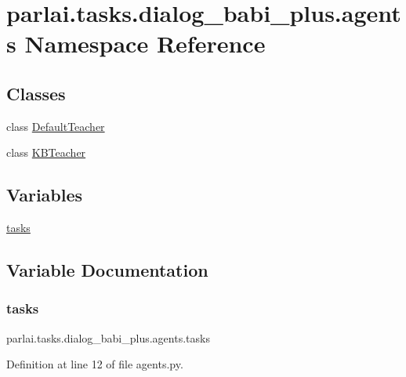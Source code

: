\hypertarget{namespaceparlai_1_1tasks_1_1dialog__babi__plus_1_1agents}{}\section{parlai.\+tasks.\+dialog\+\_\+babi\+\_\+plus.\+agents Namespace Reference}
\label{namespaceparlai_1_1tasks_1_1dialog__babi__plus_1_1agents}
\subsection*{Classes}
\begin{DoxyCompactItemize}
\item 
class \hyperlink{classparlai_1_1tasks_1_1dialog__babi__plus_1_1agents_1_1DefaultTeacher}{Default\+Teacher}
\item 
class \hyperlink{classparlai_1_1tasks_1_1dialog__babi__plus_1_1agents_1_1KBTeacher}{K\+B\+Teacher}
\end{DoxyCompactItemize}
\subsection*{Variables}
\begin{DoxyCompactItemize}
\item 
\hyperlink{namespaceparlai_1_1tasks_1_1dialog__babi__plus_1_1agents_afa6b2daed49397ccd70b3be5414eaea5}{tasks}
\end{DoxyCompactItemize}


\subsection{Variable Documentation}
\mbox{\label{namespaceparlai_1_1tasks_1_1dialog__babi__plus_1_1agents_afa6b2daed49397ccd70b3be5414eaea5}} 
\subsubsection{\texorpdfstring{tasks}{tasks}}
{\footnotesize\ttfamily parlai.\+tasks.\+dialog\+\_\+babi\+\_\+plus.\+agents.\+tasks}



Definition at line 12 of file agents.\+py.

